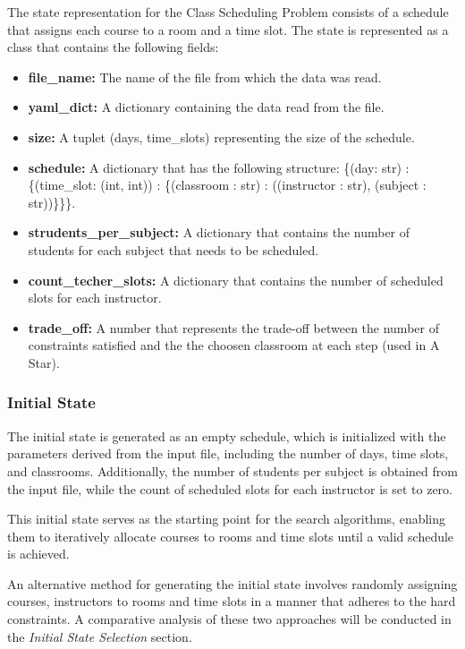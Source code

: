 \documentclass[runningheads]{paper}
\begin{document}
The state representation for the Class Scheduling Problem consists of a
schedule that assigns each course to a room and a time slot. The state is
represented as a class that contains the following fields:
\begin{itemize}
    \item \textbf{file\_name:} The name of the file from which the data was read.
    \item \textbf{yaml\_dict:} A dictionary containing the data read from the file.
    \item \textbf{size:} A tuplet (days, time\_slots) representing the size of the schedule.
    \item \textbf{schedule:} A dictionary that has the following structure: \{(day: str) : \{(time\_slot: (int, int)) : \{(classroom : str) : ((instructor : str), (subject : str))\}\}\}.
    \item \textbf{strudents\_per\_subject:} A dictionary that contains the number of students for each subject that needs to be scheduled.
    \item \textbf{count\_techer\_slots:} A dictionary that contains the number of scheduled slots for each instructor.
    \item \textbf{trade\_off:} A number that represents the trade-off between the number of constraints satisfied and the the choosen classroom at each step (used in A Star).
\end{itemize}

\subsubsection{Initial State}
The initial state is generated as an empty schedule, which is initialized with 
the parameters derived from the input file, including the number of days, time 
slots, and classrooms. Additionally, the number of students per subject is 
obtained from the input file, while the count of scheduled slots for each 
instructor is set to zero.

This initial state serves as the starting point for the search algorithms, 
enabling them to iteratively allocate courses to rooms and time slots until 
a valid schedule is achieved.

An alternative method for generating the initial state involves randomly 
assigning courses, instructors to rooms and time slots in a manner that 
adheres to the hard constraints. A comparative analysis of these two approaches 
will be conducted in the \textit{Initial State Selection} section.
\end{document}
